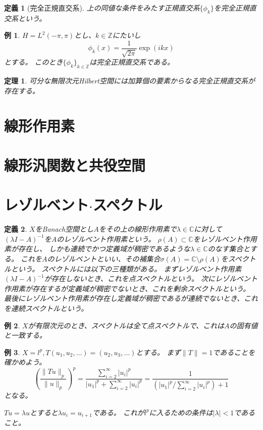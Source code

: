 \documentclass{jsarticle}
\newtheorem{dfn}{定義}
\newtheorem{eg}{例}
\newtheorem{thm}{定理}
\newcommand{\C}{\mathbb{C}}
\newcommand{\abs}[1]{|#1|}
\newcommand{\norm}[1]{\|#1\|}
\newcommand{\Z}{\mathbb{Z}}
\begin{document}
\begin{dfn}[完全正規直交系]
上の同値な条件をみたす正規直交系$\{\phi_k\}$を完全正規直交系という。
\end{dfn}

\begin{eg}
$H=L^2(-\pi,\pi)$とし、$k\in\Z$にたいし
\[
\phi_k(x)=\frac{1}{\sqrt{2\pi}}\exp(ikx)
\]
とする。
このとき$\{\phi_k\}_{k\in\Z}$は完全正規直交系である。
\end{eg}

\begin{thm}
可分な無限次元Hilbert空間には加算個の要素からなる完全正規直交系が存在する。
\end{thm}

\section{線形作用素}
\section{線形汎関数と共役空間}
\section{レゾルベント$\cdot$スペクトル}
\begin{dfn}
$X$をBanach空間とし$A$をその上の線形作用素で$\lambda\in\C$に対して
$(\lambda I-A)^{-1}$を$A$のレゾルベント作用素という。
$\rho(A)\subset \C$をレゾルベント作用素が存在し、
しかも連続でかつ定義域が稠密であるような$\lambda\in\C$のなす集合とする。
これを$A$のレゾルベントといい、その補集合$\sigma(A)=\C\setminus\rho(A)$をスペクトルという。
スペクトルには以下の三種類がある。
まずレゾルベント作用素$(\lambda I-A)^{-1}$が存在しないとき、これを点スペクトルという。
次にレゾルベント作用素が存在するが定義域が稠密でないとき、これを剰余スペクトルという。
最後にレゾルベント作用素が存在し定義域が稠密であるが連続でないとき、これを連続スペクトルという。
\end{dfn}
\begin{eg}
$X$が有限次元のとき、スペクトルは全て点スペクトルで、これは$A$の固有値と一致する。
\end{eg}

\begin{eg}
$X=l^p, T(u_1,u_2,\ldots)=(u_2,u_3,\ldots)$とする。
まず$\norm{T}=1$であることを確かめよう。
\[
(\frac{\norm{Tu}_p}{\norm{u}_p})^p=\frac{\sum_{i=2}^\infty \abs{u_i}^p}{\abs{u_1}^p+\sum_{i=2}^\infty \abs{u_i}^p}
=\frac{1}{(\abs{u_1}^p/\sum_{i=2}^\infty \abs{u_i}^p)+1}
\]
となる。

$Tu=\lambda u$とすると$\lambda u_i=u_{i+1}$である。
これが$l^p$に入るための条件は$\abs{\lambda}<1$であること。
\end{eg}
\end{document}
